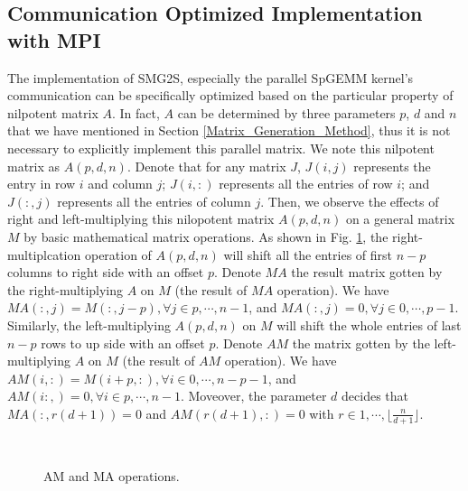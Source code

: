 \subsection{Communication Optimized Implementation with MPI}

The implementation of SMG2S, especially the parallel SpGEMM kernel's communication can be specifically optimized based on the particular property of nilpotent matrix $A$. In fact, $A$ can be determined by three parameters $p$, $d$ and $n$ that we have mentioned in Section \ref{Matrix_Generation_Method}, thus it is not necessary to explicitly implement this parallel matrix. We note this nilpotent matrix as $A(p,d,n)$. Denote that for any matrix $J$, $J(i,j)$ represents the entry in row $i$ and column $j$; $J(i,:)$ represents all the entries of row $i$; and $J(:,j)$ represents all the entries of column $j$. Then, we observe the effects of right and left-multiplying this nilopotent matrix $A(p,d,n)$ on a general matrix $M$ by basic mathematical matrix operations. As shown in Fig. \ref{fig:amma}, the right-multiplcation operation of $A(p,d,n)$ will shift all the entries of first $n-p$ columns to right side with an offset $p$. Denote $MA$ the result matrix gotten by the right-multiplying $A$ on $M$ (the result of $MA$ operation). We have $MA(:,j)=M(:,j-p), \forall j \in p,\cdots, n-1$, and $MA(:,j)=0,  \forall j \in 0,\cdots, p-1$. Similarly, the left-multiplying $A(p,d,n)$ on $M$ will shift the whole entries of last $n-p$ rows to up side with an offset $p$. Denote $AM$ the matrix gotten by the left-multiplying $A$ on $M$ (the result of $AM$ operation). We have $AM(i,:)=M(i+p,:), \forall i \in 0,\cdots, n-p-1$, and $AM(i:,)=0,  \forall i \in p,\cdots, n-1$. Moveover, the parameter $d$ decides that $MA(:,r(d+1))=0$ and $AM(r(d+1),:)=0$ with $r \in 1, \cdots, \lfloor \frac{n}{d+1}\rfloor$. 

\begin{figure}[t]
	\centering
	\\
	\caption{AM and MA operations. }
	\label{fig:amma}
\end{figure}


